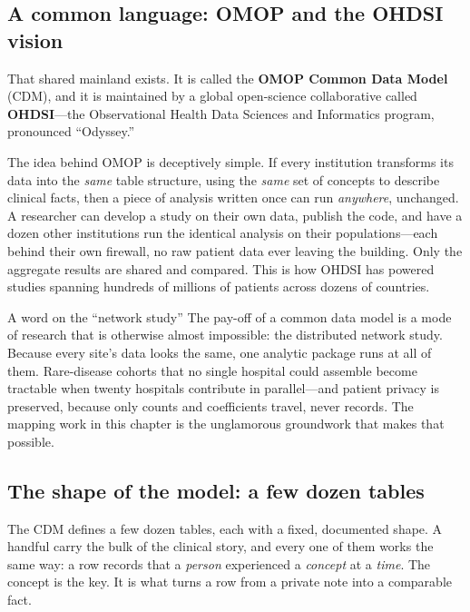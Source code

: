 \documentclass[12pt,openany]{book}
\begin{document}
\subsection{A common language: OMOP and the OHDSI vision}

That shared mainland exists. It is called the \textbf{OMOP Common Data Model} (CDM), and it is
maintained by a global open-science collaborative called \textbf{OHDSI}---the Observational Health
Data Sciences and Informatics program, pronounced ``Odyssey.''

The idea behind OMOP is deceptively simple. If every institution transforms its data into the
\emph{same} table structure, using the \emph{same} set of concepts to describe clinical facts, then a
piece of analysis written once can run \emph{anywhere}, unchanged. A researcher can develop a study on
their own data, publish the code, and have a dozen other institutions run the identical analysis on
their populations---each behind their own firewall, no raw patient data ever leaving the building.
Only the aggregate results are shared and compared. This is how OHDSI has powered studies spanning
hundreds of millions of patients across dozens of countries.

\begin{practice}{A word on the ``network study''}
The pay-off of a common data model is a mode of research that is otherwise almost impossible: the
distributed network study. Because every site's data looks the same, one analytic package runs at all
of them. Rare-disease cohorts that no single hospital could assemble become tractable when twenty
hospitals contribute in parallel---and patient privacy is preserved, because only counts and
coefficients travel, never records. The mapping work in this chapter is the unglamorous groundwork
that makes that possible.
\end{practice}

\subsection{The shape of the model: a few dozen tables}

The CDM defines a few dozen tables, each with a fixed, documented shape. A handful carry the bulk of
the clinical story, and every one of them works the same way: a row records that a \emph{person}
experienced a \emph{concept} at a \emph{time}. The concept is the key. It is what turns a row from a
private note into a comparable fact.
\end{document}
